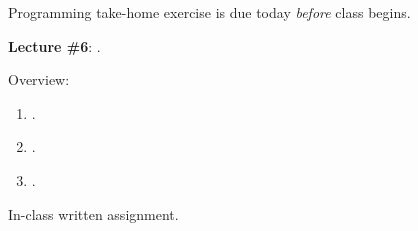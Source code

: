 \documentclass[letterpaper]{article}\usepackage[]{graphicx}\usepackage[svgnames]{xcolor}
\renewenvironment{itemize}{
  \begin{list}{}{
    \setlength{\leftmargin}{1.5em}
  }
}{
  \end{list}
}
\begin{document}
\begin{enumerate}
\begin{itemize}
\begin{enumerate}


            
         \end{enumerate}

       
           \item[{\color{red}$\diamond$}] {\color{red}Programming take-home exercise is due today \emph{before} class begins}.

      \end{itemize}

\item {\bf Lecture \#6}:  {\color{ForestGreen}{\bf Ethics}}.


      \begin{itemize} 

        \item[$\diamond$] Overview:

        \begin{enumerate}

          \item[$\bullet$] \href{https://doi.org/10.1017/CBO9780511762888.011}{}.

          \item[$\bullet$] \href{https://doi.org/10.1017/CBO9780511762888.012}{}.

          \item[$\bullet$] \href{https://doi.org/10.1017/CBO9780511762888.013}{}.

          \end{enumerate}

        \item[{\color{red}$\diamond$}] {\color{red}In-class written assignment}.
   
      \end{itemize}



\end{enumerate}


\printbibliography

\end{document}
